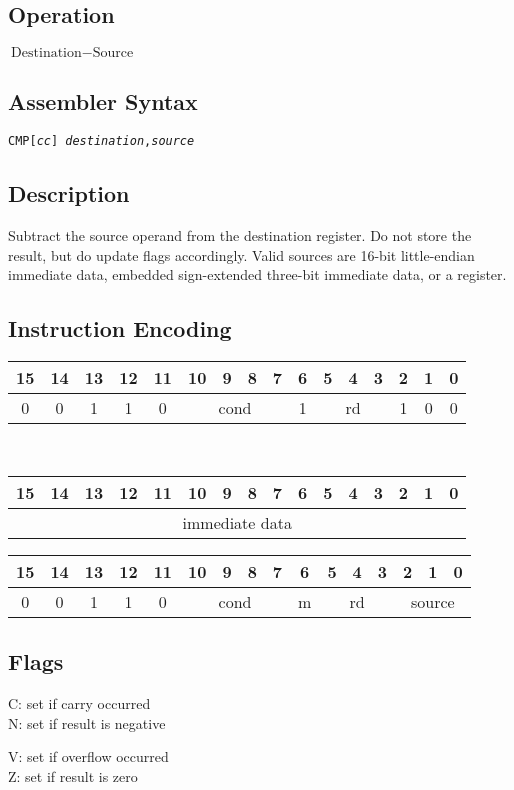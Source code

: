 \documentclass[11pt]{book}
\newcommand*{\encoding}[1]{\noindent
\begin{tabular}{|c|c|c|c|c|c|c|c|c|c|c|c|c|c|c|c|}
\multicolumn{1}{c}{15}&
\multicolumn{1}{c}{14}&
\multicolumn{1}{c}{13}&
\multicolumn{1}{c}{12}&
\multicolumn{1}{c}{11}&
\multicolumn{1}{c}{10}&
\multicolumn{1}{c}{9}&
\multicolumn{1}{c}{8}&
\multicolumn{1}{c}{7}&
\multicolumn{1}{c}{6}&
\multicolumn{1}{c}{5}&
\multicolumn{1}{c}{4}&
\multicolumn{1}{c}{3}&
\multicolumn{1}{c}{2}&
\multicolumn{1}{c}{1}&
\multicolumn{1}{c}{0}\\\hline
#1\\\hline
\end{tabular}}
\newcommand*{\instruction}[2][]{%
  \clearpage
  \thispagestyle{fancy}%
  \fancyhf[HL,HR]{\huge{#2}}%
  \fancyhf[HC]{#1}\addtocounter{section}{1}\noindent
}
\begin{document}

\instruction[Compare]{CMP}
\subsection*{Operation}
\(\text{Destination}-\text{Source}\)

\subsection*{Assembler Syntax}
\texttt{CMP[\textit{cc}] \textit{destination},\textit{source}}

\subsection*{Description}
Subtract the source operand from the destination register.
Do not store the result, but do update flags accordingly.
Valid sources are 16-bit little-endian immediate data,
embedded sign-extended three-bit immediate data,
or a register.

\subsection*{Instruction Encoding}
\encoding{0&0&1&1&0%
&\multicolumn{4}{|c|}{cond}%
&1&\multicolumn{3}{|c|}{rd}&1&0&0}\\\null\qquad
\encoding{\multicolumn{16}{|c|}{immediate data}}

\vspace{2\baselineskip}
\encoding{0&0&1&1&0%
&\multicolumn{4}{|c|}{cond}%
&m&\multicolumn{3}{|c|}{rd}&\multicolumn{3}{|c|}{source}}

\subsection*{Flags}
\begin{multicols}{2}\noindent
  C: set if carry occurred\\
  N: set if result is negative

  \columnbreak\noindent
  V: set if overflow occurred\\
  Z: set if result is zero
\end{multicols}
\end{document}
